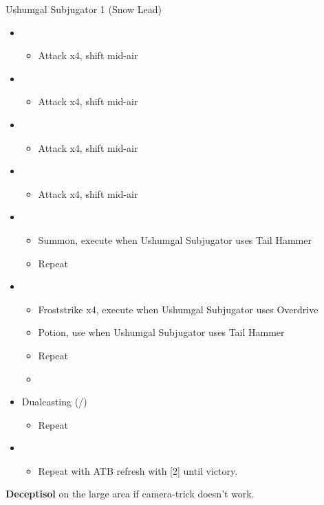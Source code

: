\begin{multicols}{2}
\renewcommand{\sixth}{[6] Dualcasting (\rav/\rav)}
\begin{battle}{Ushumgal Subjugator 1 (Snow Lead)}
\begin{itemize}
    \item \first
    \begin{itemize}
        \item Attack x4, shift mid-air
    \end{itemize}
    \item \second
    \begin{itemize}
        \item Attack x4, shift mid-air
    \end{itemize}
    \item \first
    \begin{itemize}
        \item Attack x4, shift mid-air
    \end{itemize}
    \item \second
    \begin{itemize}
        \item Attack x4, shift mid-air
    \end{itemize}
    \item \first
    \begin{itemize}
        \item Summon, execute when Ushumgal Subjugator uses Tail Hammer
        \item Repeat
     \end{itemize}
    \item \fifth
    \begin{itemize}
        \item Froststrike x4, execute when Ushumgal Subjugator uses Overdrive
        \item Potion, use when Ushumgal Subjugator uses Tail Hammer
        \item Repeat
        \item \stagger
    \end{itemize}
    \item \sixth
    \begin{itemize}
        \item Repeat
    \end{itemize}
    \item \first
    \begin{itemize}
        \item Repeat with ATB refresh with [2] until victory.
    \end{itemize}
\end{itemize}
\end{battle}

\textbf{Deceptisol} on the large area if camera-trick doesn't work.
\vfill
\end{multicols}
